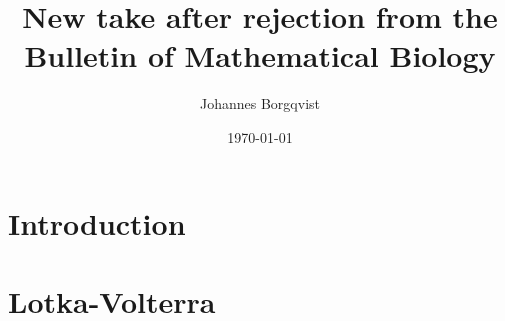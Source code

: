 \documentclass[12pt]{article}
\begin{document}
\title{\textbf{New take after rejection from the Bulletin of Mathematical Biology}}
\author{Johannes Borgqvist}
\date{\today}
\maketitle
\tableofcontents
\clearpage
\section{Introduction}

\section{Lotka-Volterra}

\end{document}
